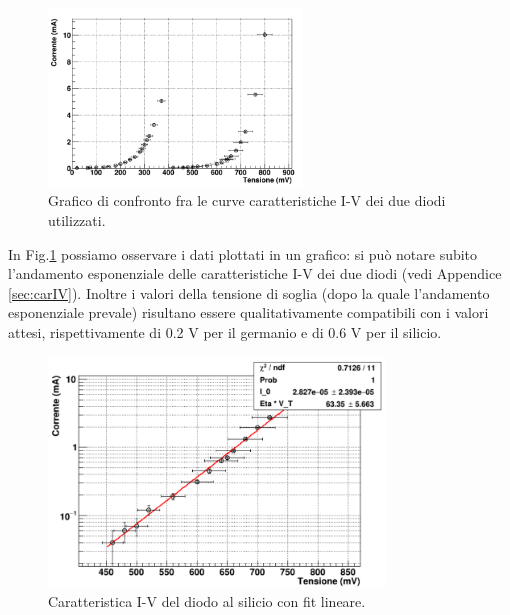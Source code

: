 \documentclass[a4paper, 11pt]{article}
\begin{document}
\begin{figure}[!htb]
    \centering
    \includegraphics[width = 0.6\textwidth]{Immagini - Prima prova/Grafico totale.png}
    \caption{Grafico di confronto fra le curve caratteristiche I-V dei due diodi utilizzati.}
    \label{fig:graficototale}
\end{figure}

\newpage
In Fig.\ref{fig:graficototale} possiamo osservare i dati plottati in un grafico: si può notare subito l'andamento esponenziale delle caratteristiche I-V dei due diodi (vedi Appendice \ref{sec:carIV}). Inoltre i valori della tensione di soglia (dopo la quale l'andamento esponenziale prevale) risultano essere qualitativamente compatibili con i valori attesi, rispettivamente di 0.2 V per il germanio e di 0.6 V per il silicio.
\\

\begin{figure}[!htb]
    \centering
    \includegraphics[width = 0.8\textwidth]{Immagini - Prima prova/Fit silicio.png}
    \caption{Caratteristica I-V del diodo al silicio con fit lineare.}
    \label{fig:siliciofit}
\end{figure}

\newpage
\end{document}
